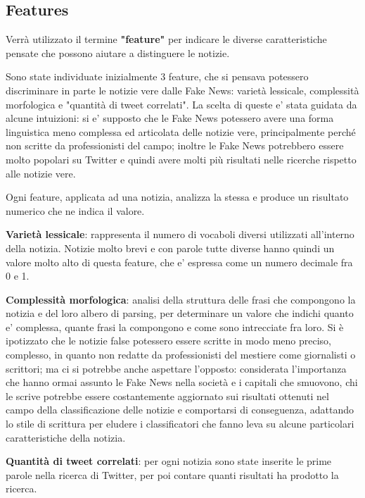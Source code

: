 \documentclass{article}
\begin{document}
\begin{multicols}{2}
	    \section{Features}
		    Verrà utilizzato il termine \textbf{"feature"} per indicare le diverse caratteristiche pensate che possono aiutare a distinguere le notizie.
		    
			Sono state individuate inizialmente 3 feature, che si pensava potessero discriminare in parte le notizie vere dalle Fake News: varietà lessicale, complessità morfologica e "quantità di tweet correlati". 
			La scelta di queste e' stata guidata da alcune intuizioni: si e' supposto che le Fake News potessero avere una forma linguistica meno complessa ed articolata delle notizie vere, principalmente perché non scritte da professionisti del campo; inoltre le Fake News potrebbero essere molto popolari su Twitter e quindi avere molti più risultati nelle ricerche rispetto alle notizie vere.
			
			
			
			Ogni feature, applicata ad una notizia, analizza la stessa e produce un risultato numerico che ne indica il valore.
			
			\textbf{Varietà lessicale}: rappresenta il numero di vocaboli diversi utilizzati all'interno della notizia. Notizie molto brevi e con parole tutte diverse hanno quindi un valore molto alto di questa feature, che e' espressa come un numero decimale fra 0 e 1.
			
			\textbf{Complessità morfologica}: analisi della struttura delle frasi che compongono la notizia e del loro albero di parsing, per determinare un valore che indichi quanto e' complessa, quante frasi la compongono e come sono intrecciate fra loro.
			Si è ipotizzato che le notizie false potessero essere scritte in modo meno preciso, complesso, in quanto non redatte da professionisti del mestiere come giornalisti o scrittori; ma ci si potrebbe anche aspettare l'opposto: considerata l'importanza che hanno ormai assunto le Fake News nella società e i capitali che smuovono, chi le scrive potrebbe essere costantemente aggiornato sui risultati ottenuti nel campo della classificazione delle notizie e comportarsi di conseguenza, adattando lo stile di scrittura per eludere i classificatori che fanno leva su alcune particolari caratteristiche della notizia.
			
			
			\textbf{Quantità di tweet correlati}: per ogni notizia sono state inserite le prime parole nella ricerca di Twitter, per poi contare quanti risultati ha prodotto la ricerca.



\end{multicols}
\end{document}
